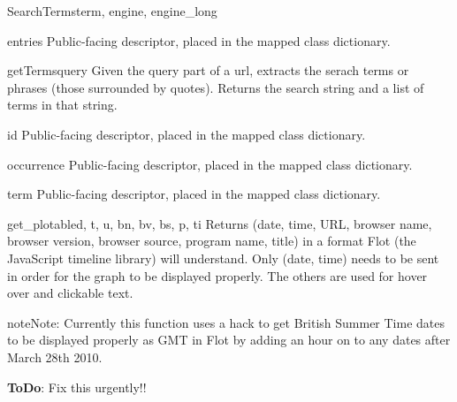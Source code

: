 \documentclass[letterpaper,10pt,english]{manual}
\begin{document}
\begin{classdesc}{SearchTerms}{term, engine, engine\_long}
\hypertarget{webscavator.model.models.SearchTerms.entries}{}\begin{memberdesc}{entries}
Public-facing descriptor, placed in the mapped class dictionary.
\end{memberdesc}

\hypertarget{webscavator.model.models.SearchTerms.getTerms}{}\begin{staticmethoddesc}{getTerms}{query}
Given the query part of a url, extracts the serach terms or phrases (those surrounded
by quotes). Returns the search string and a list of terms in that string.
\end{staticmethoddesc}

\hypertarget{webscavator.model.models.SearchTerms.id}{}\begin{memberdesc}{id}
Public-facing descriptor, placed in the mapped class dictionary.
\end{memberdesc}

\hypertarget{webscavator.model.models.SearchTerms.occurrence}{}\begin{memberdesc}{occurrence}
Public-facing descriptor, placed in the mapped class dictionary.
\end{memberdesc}

\hypertarget{webscavator.model.models.SearchTerms.term}{}\begin{memberdesc}{term}
Public-facing descriptor, placed in the mapped class dictionary.
\end{memberdesc}
\end{classdesc}

\hypertarget{webscavator.model.models.get_plotable}{}\begin{funcdesc}{get\_plotable}{d, t, u, bn, bv, bs, p, ti}
Returns (date, time, URL, browser name, browser version, browser source, program name, title)
in a format Flot (the JavaScript timeline library) will understand. 
Only (date, time) needs to be sent in order
for the graph to be displayed properly. The others are used for hover over and clickable text.

\begin{notice}{note}{Note:}
Currently this function uses a hack to get British Summer Time dates to be displayed
properly as GMT in Flot by adding an hour on to any dates after March 28th 2010.

\textbf{ToDo}: Fix this urgently!!
\end{notice}
\end{funcdesc}
\end{document}
